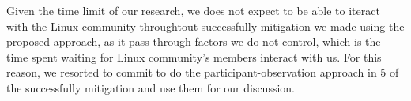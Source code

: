 Given the time limit of our research, we does not expect to be able to iteract with the Linux community throughtout successfully
mitigation we made using the proposed approach, as it pass through factors we do not control, which is the time spent waiting 
for Linux community's members interact with us.
For this reason, we resorted to commit to do the participant-observation approach 
in 5 of the successfully mitigation and use them for our discussion. 





